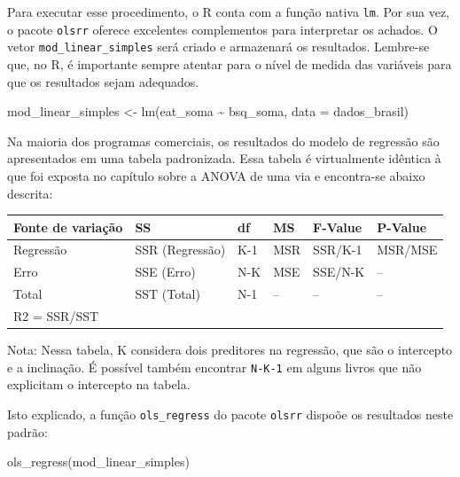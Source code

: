 \documentclass[
]{book}
\newenvironment{Shaded}{\begin{snugshade}}{\end{snugshade}}
\newcommand{\AttributeTok}[1]{\textcolor[rgb]{0.77,0.63,0.00}{#1}}
\newcommand{\FunctionTok}[1]{\textcolor[rgb]{0.00,0.00,0.00}{#1}}
\newcommand{\NormalTok}[1]{#1}
\newcommand{\OtherTok}[1]{\textcolor[rgb]{0.56,0.35,0.01}{#1}}
\newcommand{\SpecialCharTok}[1]{\textcolor[rgb]{0.00,0.00,0.00}{#1}}
\begin{document}
Para executar esse procedimento, o R conta com a função nativa \texttt{lm}. Por sua vez, o pacote \texttt{olsrr} oferece excelentes complementos para interpretar os achados. O vetor \texttt{mod\_linear\_simples} será criado e armazenará os resultados. Lembre-se que, no R, é importante sempre atentar para o nível de medida das variáveis para que os resultados sejam adequados.

\begin{Shaded}
\begin{Highlighting}[]
\NormalTok{mod\_linear\_simples }\OtherTok{\textless{}{-}} \FunctionTok{lm}\NormalTok{(eat\_soma }\SpecialCharTok{\textasciitilde{}}\NormalTok{ bsq\_soma, }\AttributeTok{data =}\NormalTok{ dados\_brasil)}
\end{Highlighting}
\end{Shaded}

Na maioria dos programas comerciais, os resultados do modelo de regressão são apresentados em uma tabela padronizada. Essa tabela é virtualmente idêntica à que foi exposta no capítulo sobre a ANOVA de uma via e encontra-se abaixo descrita:

\begin{longtable}[]{@{}llllll@{}}
\toprule
Fonte de variação & SS & df & MS & F-Value & P-Value \\
\midrule
\endhead
Regressão & SSR (Regressão) & K-1 & MSR & SSR/K-1 & MSR/MSE \\
Erro & SSE (Erro) & N-K & MSE & SSE/N-K & -- \\
Total & SST (Total) & N-1 & -- & -- & -- \\
R2 = SSR/SST & & & & & \\
\bottomrule
\end{longtable}

Nota: Nessa tabela, K considera dois preditores na regressão, que são o intercepto e a inclinação. É possível também encontrar \texttt{N-K-1} em alguns livros que não explicitam o intercepto na tabela.

Isto explicado, a função \texttt{ols\_regress} do pacote \texttt{olsrr} dispoõe os resultados neste padrão:

\begin{Shaded}
\begin{Highlighting}[]
\FunctionTok{ols\_regress}\NormalTok{(mod\_linear\_simples) }
\end{Highlighting}
\end{Shaded}
\end{document}
